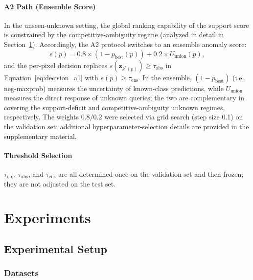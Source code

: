 \documentclass[journal]{IEEEtai}
\newcommand{\bz}{\mathbf{z}}
\newcommand{\tobj}{\tau_{\text{obj}}}
\newcommand{\tabs}{\tau_{\text{abs}}}
\newcommand{\tens}{\tau_{\text{ens}}}
\begin{document}
\paragraph{A2 Path (Ensemble Score)}
In the unseen-unknown setting, the global ranking capability of the support score
is constrained by the competitive-ambiguity regime (analyzed in detail in
Section~\ref{sec:exp}).
Accordingly, the A2 protocol switches to an ensemble anomaly score:
\begin{equation}\label{eq:ensemble}
  e(p) = 0.8 \times \left(1 - p_{\text{best}}(p)\right) + 0.2 \times U_{\text{union}}(p),
\end{equation}
and the per-pixel decision replaces $s(\bz_{k^*(p)}) \geq \tabs$ in
Equation~\eqref{eq:decision_a1} with $e(p) \geq \tens$.
In the ensemble, $(1 - p_{\text{best}})$ (i.e., neg-maxprob) measures the uncertainty
of known-class predictions, while $U_{\text{union}}$ measures the direct response of
unknown queries; the two are complementary in covering the support-deficit and
competitive-ambiguity unknown regimes, respectively.
The weights $0.8/0.2$ were selected via grid search (step size 0.1) on the validation
set; additional hyperparameter-selection details are provided in the supplementary
material.

\paragraph{Threshold Selection}
$\tobj$, $\tabs$, and $\tens$ are all determined once on the validation set and then
frozen; they are not adjusted on the test set.


\section{Experiments}\label{sec:exp}

\subsection{Experimental Setup}\label{sec:exp:setup}

\subsubsection{Datasets}\label{sec:exp:setup:data}
\end{document}
